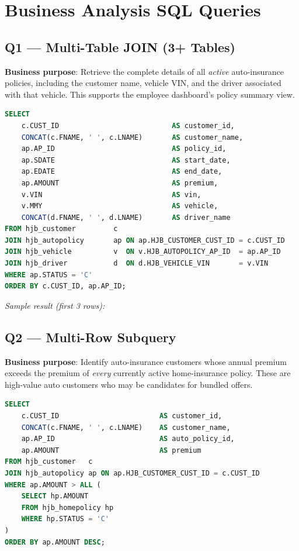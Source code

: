 \documentclass[12pt,letterpaper]{article}
\begin{document}
\section{Business Analysis SQL Queries}

\subsection{Q1 --- Multi-Table JOIN (3+ Tables)}

\textbf{Business purpose}: Retrieve the complete details of all \emph{active} auto-insurance policies, including the customer name, vehicle VIN, and the driver associated with that vehicle. This supports the employee dashboard's policy summary view.

\begin{lstlisting}[language=SQL,caption={Q1: 4-table JOIN on active auto policies}]
SELECT
    c.CUST_ID                           AS customer_id,
    CONCAT(c.FNAME, ' ', c.LNAME)       AS customer_name,
    ap.AP_ID                            AS policy_id,
    ap.SDATE                            AS start_date,
    ap.EDATE                            AS end_date,
    ap.AMOUNT                           AS premium,
    v.VIN                               AS vin,
    v.MMY                               AS vehicle,
    CONCAT(d.FNAME, ' ', d.LNAME)       AS driver_name
FROM hjb_customer         c
JOIN hjb_autopolicy       ap ON ap.HJB_CUSTOMER_CUST_ID = c.CUST_ID
JOIN hjb_vehicle          v  ON v.HJB_AUTOPOLICY_AP_ID  = ap.AP_ID
JOIN hjb_driver           d  ON d.HJB_VEHICLE_VIN       = v.VIN
WHERE ap.STATUS = 'C'
ORDER BY c.CUST_ID, ap.AP_ID;
\end{lstlisting}

\textit{Sample result (first 3 rows):}



\subsection{Q2 --- Multi-Row Subquery}

\textbf{Business purpose}: Identify auto-insurance customers whose annual premium exceeds the premium of \emph{every} currently active home-insurance policy. These are high-value auto customers who may be candidates for bundled offers.

\begin{lstlisting}[language=SQL,caption={Q2: Multi-row subquery using ALL}]
SELECT
    c.CUST_ID                        AS customer_id,
    CONCAT(c.FNAME, ' ', c.LNAME)    AS customer_name,
    ap.AP_ID                         AS auto_policy_id,
    ap.AMOUNT                        AS premium
FROM hjb_customer   c
JOIN hjb_autopolicy ap ON ap.HJB_CUSTOMER_CUST_ID = c.CUST_ID
WHERE ap.AMOUNT > ALL (
    SELECT hp.AMOUNT
    FROM hjb_homepolicy hp
    WHERE hp.STATUS = 'C'
)
ORDER BY ap.AMOUNT DESC;
\end{lstlisting}
\end{document}
